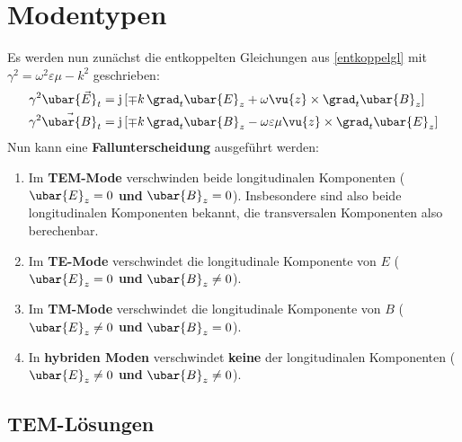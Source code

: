 \section{Modentypen}
	Es werden nun zunächst die entkoppelten Gleichungen aus \ref{entkoppelgl} mit  \(\gamma^2= \omega^2\varepsilon\mu -  k^2\) geschrieben:
	\begin{equation}\begin{split}
			\gamma^2\ubar{\vec{E}}_t &= \mathrm{j}\left[ \mp  k\, \grad _t \ubar{E}_{z} + \omega  \vu{z}\times\grad _t \ubar{B}_{z}\right]\\
			\gamma^2\vec{\ubar{B}}_t &= \mathrm{j}\left[ \mp  k\, \grad _t \ubar{B}_{z} - \omega\varepsilon\mu  \vu{z}\times\grad _t \ubar{E}_{z}\right]
	\end{split}\end{equation}
Nun kann eine \textbf{Fallunterscheidung} ausgeführt werden:
\begin{enumerate}
	\item Im \textbf{TEM-Mode} verschwinden beide longitudinalen Komponenten (\(\ubar{E}_z=0\) \textbf{und} \(\ubar{B}_z=0\)). Insbesondere sind also beide longitudinalen Komponenten bekannt, die transversalen Komponenten also berechenbar.
	\item Im \textbf{TE-Mode} verschwindet die longitudinale Komponente von $E$ (\(\ubar{E}_z=0\) \textbf{und} \(\ubar{B}_z\neq0\)).
	\item Im \textbf{TM-Mode} verschwindet die longitudinale Komponente von $B$ (\(\ubar{E}_z\neq0\) \textbf{und} \(\ubar{B}_z= 0\)).
	\item In \textbf{hybriden Moden} verschwindet \textbf{keine} der longitudinalen Komponenten (\(\ubar{E}_z\neq0\) \textbf{und} \(\ubar{B}_z\neq0\)).
\end{enumerate}
\subsection{TEM-Lösungen}\label{tem-loes}
